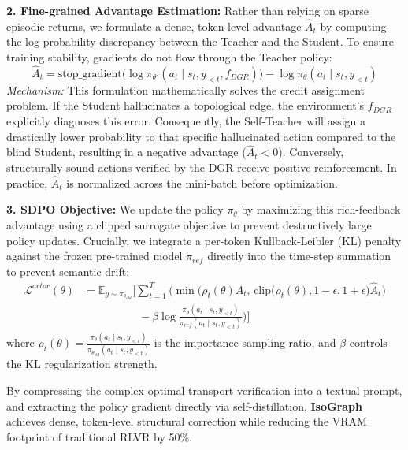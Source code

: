 \documentclass{article}
\begin{document}
\textbf{2. Fine-grained Advantage Estimation:} 
Rather than relying on sparse episodic returns, we formulate a dense, token-level advantage $\hat{A}_t$ by computing the log-probability discrepancy between the Teacher and the Student. To ensure training stability, gradients do not flow through the Teacher policy:
\begin{equation}
    \hat{A}_t = \text{stop\_gradient}\Big( \log \pi_{\theta'}(a_t \mid s_t, y_{<t}, f_{DGR}) \Big) - \log \pi_\theta(a_t \mid s_t, y_{<t})
\end{equation}
\textit{Mechanism:} This formulation mathematically solves the credit assignment problem. If the Student hallucinates a topological edge, the environment's $f_{DGR}$ explicitly diagnoses this error. Consequently, the Self-Teacher will assign a drastically lower probability to that specific hallucinated action compared to the blind Student, resulting in a negative advantage ($\hat{A}_t < 0$). Conversely, structurally sound actions verified by the DGR receive positive reinforcement. In practice, $\hat{A}_t$ is normalized across the mini-batch before optimization.

\textbf{3. SDPO Objective:} 
We update the policy $\pi_\theta$ by maximizing this rich-feedback advantage using a clipped surrogate objective to prevent destructively large policy updates. Crucially, we integrate a per-token Kullback-Leibler (KL) penalty against the frozen pre-trained model $\pi_{ref}$ directly into the time-step summation to prevent semantic drift:
\begin{equation}
\begin{aligned}
    \mathcal{L}^{actor}(\theta) &= \mathbb{E}_{y \sim \pi_{\theta_{old}}} \Bigg[ \sum_{t=1}^T \Bigg( \min \Big( \rho_t(\theta) \hat{A}_t, \, \text{clip}\big(\rho_t(\theta), 1-\epsilon, 1+\epsilon\big) \hat{A}_t \Big) \\
    &\quad\quad\quad\quad\quad - \beta \log \frac{\pi_\theta(a_t \mid s_t, y_{<t})}{\pi_{ref}(a_t \mid s_t, y_{<t})} \Bigg) \Bigg]
\end{aligned}
\end{equation}
where $\rho_t(\theta) = \frac{\pi_\theta(a_t \mid s_t, y_{<t})}{\pi_{\theta_{old}}(a_t \mid s_t, y_{<t})}$ is the importance sampling ratio, and $\beta$ controls the KL regularization strength.

By compressing the complex optimal transport verification into a textual prompt, and extracting the policy gradient directly via self-distillation, \textbf{IsoGraph} achieves dense, token-level structural correction while reducing the VRAM footprint of traditional RLVR by 50\%.
\end{document}
